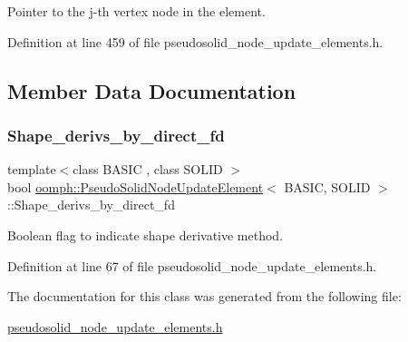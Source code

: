 Pointer to the j-\/th vertex node in the element. 



Definition at line 459 of file pseudosolid\+\_\+node\+\_\+update\+\_\+elements.\+h.



\subsection{Member Data Documentation}
\mbox{\label{classoomph_1_1PseudoSolidNodeUpdateElement_a09f75eb760cb430ff6a54a8e88a7bc16}} 
\subsubsection{\texorpdfstring{Shape\+\_\+derivs\+\_\+by\+\_\+direct\+\_\+fd}{Shape\_derivs\_by\_direct\_fd}}
{\footnotesize\ttfamily template$<$class B\+A\+S\+IC , class S\+O\+L\+ID $>$ \\
bool \hyperlink{classoomph_1_1PseudoSolidNodeUpdateElement}{oomph\+::\+Pseudo\+Solid\+Node\+Update\+Element}$<$ B\+A\+S\+IC, S\+O\+L\+ID $>$\+::Shape\+\_\+derivs\+\_\+by\+\_\+direct\+\_\+fd\hspace{0.3cm}{\ttfamily [private]}}



Boolean flag to indicate shape derivative method. 



Definition at line 67 of file pseudosolid\+\_\+node\+\_\+update\+\_\+elements.\+h.



The documentation for this class was generated from the following file\+:\begin{DoxyCompactItemize}
\item 
\hyperlink{pseudosolid__node__update__elements_8h}{pseudosolid\+\_\+node\+\_\+update\+\_\+elements.\+h}\end{DoxyCompactItemize}
